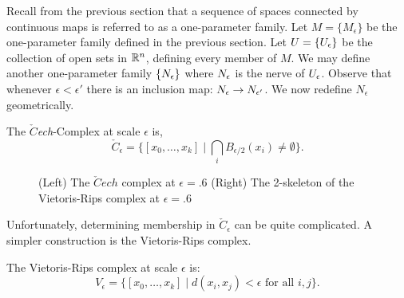 Recall from the previous section that a sequence of spaces connected by continuous maps is referred to as a one-parameter family. Let $M = \{M_\epsilon\}$ be the one-parameter family defined in the previous section. Let $U = \{U_\epsilon\}$ be the collection of open sets in $\mathbb{R}^n$, defining every member of $M$. We may define another one-parameter family $\{ N_\epsilon \}$ where $N_\epsilon$ is the nerve of $U_\epsilon$. Observe that whenever $\epsilon < \epsilon'$ there is an inclusion map: $N_\epsilon \rightarrow N_{\epsilon'}$.
We now redefine $N_{\epsilon}$ geometrically.
\begin{definition}
The \emph{$\check{C}$ech}-Complex at scale $\epsilon$ is,
\[ \check{C}_\epsilon = \{ [ x_0, \ldots,x_k] \mid \bigcap_i B_{\epsilon/2}(x_i)  \neq \emptyset \}. \]
\end{definition}
\begin{figure}
\centering
 \hspace{1cm}
\caption{(Left) The $\check{C}ech$ complex at $\epsilon = .6$ (Right) The 2-skeleton of the Vietoris-Rips complex at $\epsilon = .6$ }
\label{fig:c-and-r}
\end{figure}
Unfortunately, determining membership in $\check{C}_\epsilon$ can be quite complicated. A simpler construction is the 
Vietoris-Rips complex.
\begin{definition}
The Vietoris-Rips complex at scale $\epsilon$ is:
\[ V_\epsilon = \{ [x_0, \ldots, x_k] \mid d(x_i, x_j) < \epsilon \textrm{ for all } i,j  \}. \]
\end{definition}
